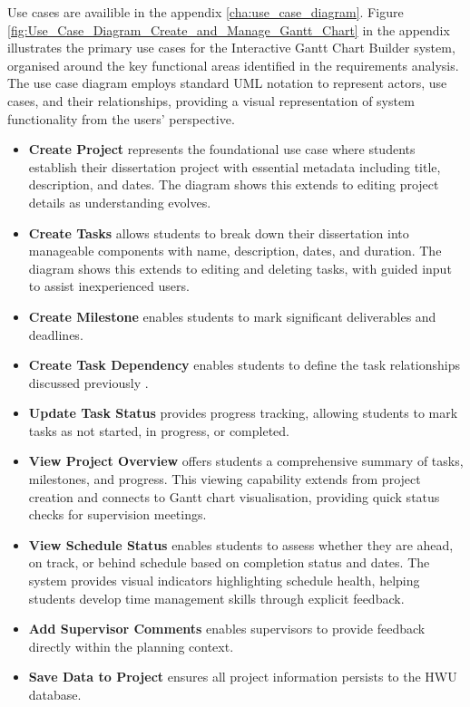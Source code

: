 \documentclass[12pt,nonacm,acmlarge,titlepage,screen]{acmart}
\begin{document}
Use cases are availible in the appendix \cref{cha:use_case_diagram}. Figure \ref{fig:Use_Case_Diagram_Create_and_Manage_Gantt_Chart} in the appendix illustrates the primary use cases for the Interactive Gantt Chart Builder system, organised around the key functional areas identified in the requirements analysis. The use case diagram employs standard UML notation to represent actors, use cases, and their relationships, providing a visual representation of system functionality from the users' perspective.


\begin{itemize}
 

    \item \textbf{Create Project} represents the foundational use case where students establish their dissertation project with essential metadata including title, description, and dates. The diagram shows this extends to editing project details as understanding evolves. 

    \item \textbf{Create Tasks} allows students to break down their dissertation into manageable components with name, description, dates, and duration. The diagram shows this extends to editing and deleting tasks, with guided input to assist inexperienced users. 

    \item \textbf{Create Milestone} enables students to mark significant deliverables and deadlines. 

    \item \textbf{Create Task Dependency} enables students to define the task relationships discussed previously \cite{besner_2008}. 

    \item \textbf{Update Task Status} provides progress tracking, allowing students to mark tasks as not started, in progress, or completed. 

    \item \textbf{View Project Overview} offers students a comprehensive summary of tasks, milestones, and progress. This viewing capability extends from project creation and connects to Gantt chart visualisation, providing quick status checks for supervision meetings. 

    \item \textbf{View Schedule Status} enables students to assess whether they are ahead, on track, or behind schedule based on completion status and dates. The system provides visual indicators highlighting schedule health, helping students develop time management skills through explicit feedback. 

    \item \textbf{Add Supervisor Comments} enables supervisors to provide feedback directly within the planning context. 

    \item \textbf{Save Data to Project} ensures all project information persists to the HWU database. 

\end{itemize}
\end{document}
